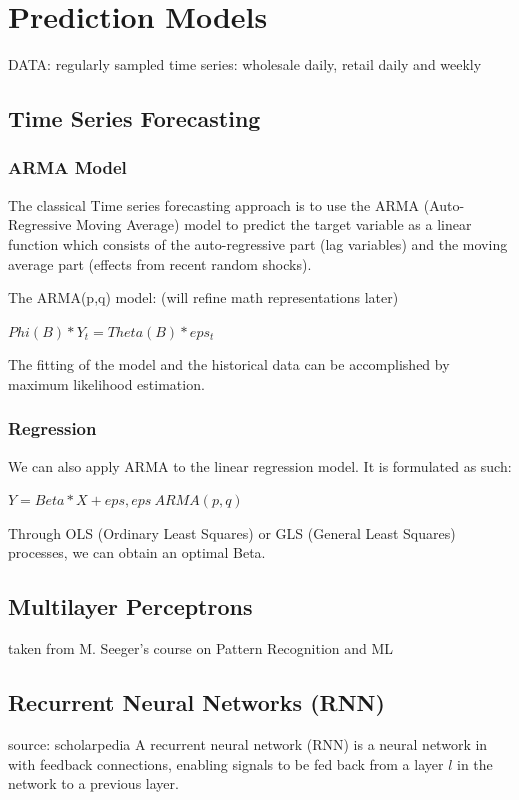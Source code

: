 \section*{Prediction Models}
DATA: regularly sampled time series: wholesale daily, retail daily and weekly

\subsection*{Time Series Forecasting}

\subsubsection*{ARMA Model}
The classical Time series forecasting approach is to use the ARMA (Auto-Regressive
Moving Average) model to predict the target variable as a linear function which
consists of the auto-regressive part (lag variables) and the moving average part
(effects from recent random shocks).

The ARMA(p,q) model: (will refine math representations later)

$Phi(B) * Y_t = Theta(B) * eps_t$

The fitting of the model and the historical
data can be accomplished by maximum likelihood estimation.

\subsubsection*{Regression}
We can also apply ARMA to the linear regression model. It is formulated as such:

$Y = Beta*X + eps,   eps ~ ARMA(p,q)$

Through OLS (Ordinary Least Squares) or GLS (General Least Squares) processes,
we can obtain an optimal Beta.

\subsection*{Multilayer Perceptrons}
taken from M. Seeger's course on Pattern Recognition and ML

\subsection*{Recurrent Neural Networks (RNN)}
source: scholarpedia
A recurrent neural network (RNN) is a neural network in with feedback connections, enabling signals to be fed back from a layer $l$ in the network to a previous layer. %

